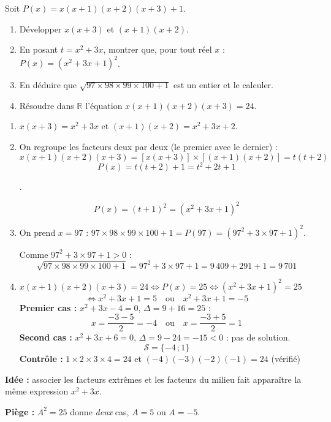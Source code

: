 
\newcommand{\R}{\mathbb{R}}
\newcommand{\vect}[1]{\overrightarrow{#1}}

Soit $P(x)=x(x+1)(x+2)(x+3)+1$.
\begin{enumerate}
  \item Développer $x(x+3)$ et $(x+1)(x+2)$.
  \item En posant $t=x^2+3x$, montrer que, pour tout réel $x$ : $P(x)=\left(x^2+3x+1\right)^2$.
  \item En déduire que $\sqrt{97\times98\times99\times100+1}$ est un entier et le calculer.
  \item Résoudre dans $\R$ l'équation $x(x+1)(x+2)(x+3)=24$.
\end{enumerate}

\begin{enumerate}[itemsep=14pt]
  \item $x(x+3)=x^2+3x$ \quad et \quad $(x+1)(x+2)=x^2+3x+2$.

  \item On regroupe les facteurs deux par deux (le premier avec le dernier) :
  \[x(x+1)(x+2)(x+3)=\left[x(x+3)\right]\times\left[(x+1)(x+2)\right]=t(t+2)\]
  \[P(x)=t(t+2)+1=t^2+2t+1\]
  \begin{prop}
  .
  \end{prop}
  \[P(x)=(t+1)^2=\left(x^2+3x+1\right)^2\]

  \item On prend $x=97$ : $97\times98\times99\times100+1=P(97)=\left(97^2+3\times97+1\right)^2$.

  Comme $97^2+3\times97+1>0$ :
  \[\sqrt{97\times98\times99\times100+1}=97^2+3\times97+1=9\,409+291+1=9\,701\]

  \item $x(x+1)(x+2)(x+3)=24\iff P(x)=25\iff\left(x^2+3x+1\right)^2=25$
  \[\iff x^2+3x+1=5\quad\text{ou}\quad x^2+3x+1=-5\]
  \textbf{Premier cas :} $x^2+3x-4=0$, $\Delta=9+16=25$ :
  \[x=\dfrac{-3-5}{2}=-4\quad\text{ou}\quad x=\dfrac{-3+5}{2}=1\]
  \textbf{Second cas :} $x^2+3x+6=0$, $\Delta=9-24=-15<0$ : pas de solution.
  \[\mathcal S=\{-4\,;1\}\]
  \textbf{Contrôle :} $1\times2\times3\times4=24$ et $(-4)(-3)(-2)(-1)=24$ (vérifié)
\end{enumerate}
\textbf{Idée :} associer les facteurs extrêmes et les facteurs du milieu fait apparaître la même expression $x^2+3x$.

\textbf{Piège :} $A^2=25$ donne \emph{deux} cas, $A=5$ ou $A=-5$.
